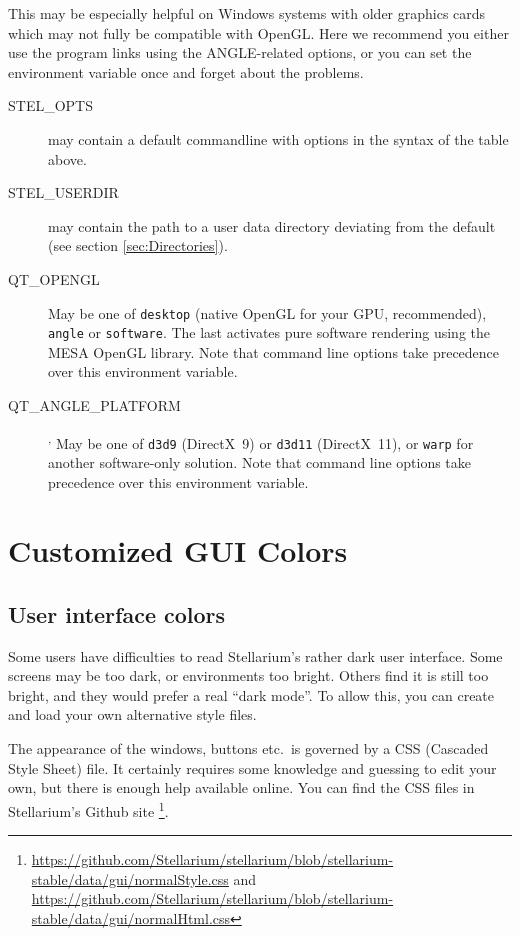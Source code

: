 This may be especially helpful on Windows systems with older graphics
cards which may not fully be compatible with OpenGL. Here we recommend
you either use the program links using the ANGLE-related options, or
you can set the environment variable once and forget about the
problems.

\begin{description}
\item[STEL\_OPTS] may contain a default commandline with options in the syntax of the table above.
\item[STEL\_USERDIR] may contain the path to a user data directory
  deviating from the default (see section \ref{sec:Directories}).
\item[QT\_OPENGL] May be one of \texttt{desktop} (native OpenGL for your GPU, recommended),
  \texttt{angle} or \texttt{software}. The last activates pure software rendering using the MESA OpenGL library. Note that command line options take precedence over this environment variable.
\item[QT\_ANGLE\_PLATFORM]\textsuperscript{,} May be one of \texttt{d3d9} (DirectX~9) or \texttt{d3d11} (DirectX~11),
  or \texttt{warp} for another software-only solution. Note that command line options take precedence over this environment variable.
\end{description}

\section{Customized GUI Colors}
\subsection{User interface colors}
\label{sec:CommandLineOptions:Special:CSS}

Some users have difficulties to read Stellarium's rather dark user
interface. Some screens may be too dark, or environments too
bright. Others find it is still too bright, and they would prefer a
real ``dark mode''. To allow this, you can create and load your own alternative style files.

The appearance of the windows, buttons etc.\ is governed by a CSS
(Cascaded Style Sheet) file. It certainly requires some knowledge and
guessing to edit your own, but there is enough help available
online. You can find the CSS files in Stellarium's Github site%
\footnote{\url{https://github.com/Stellarium/stellarium/blob/stellarium-stable/data/gui/normalStyle.css} and
  \url{https://github.com/Stellarium/stellarium/blob/stellarium-stable/data/gui/normalHtml.css}}.


